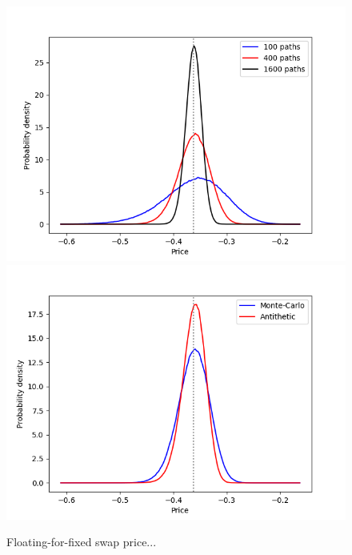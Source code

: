 \begin{figure}
\centering
\includegraphics[scale=0.7]{figures/hw_1f_swap/density_2d_Swap_False.png}
\includegraphics[scale=0.7]{figures/hw_1f_swap/density_2d_Swap_400.png}
\caption{Floating-for-fixed swap price...}
\end{figure}


